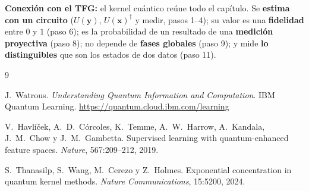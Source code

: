 \documentclass[11pt, a4paper, twoside, openright]{report}
\begin{document}
\noindent \textbf{Conexión con el TFG:} el kernel cuántico reúne todo el capítulo. Se \textbf{estima con un circuito} ($U(\mathbf{y})$, $U(\mathbf{x})^\dagger$ y medir, pasos 1--4); su valor es una \textbf{fidelidad} entre $0$ y $1$ (paso 6); es la probabilidad de un resultado de una \textbf{medición proyectiva} (paso 8); no depende de \textbf{fases globales} (paso 9); y mide \textbf{lo distinguibles} que son los estados de dos datos (paso 11).



\cleardoublepage
\begin{thebibliography}{9}

J.~Watrous.
\newblock \emph{Understanding Quantum Information and Computation}.
\newblock IBM Quantum Learning.
\newblock \url{https://quantum.cloud.ibm.com/learning}

V.~Havlíček, A.~D.~Córcoles, K.~Temme, A.~W.~Harrow, A.~Kandala, J.~M.~Chow y J.~M.~Gambetta.
\newblock Supervised learning with quantum-enhanced feature spaces.
\newblock \emph{Nature}, 567:209--212, 2019.

S.~Thanasilp, S.~Wang, M.~Cerezo y Z.~Holmes.
\newblock Exponential concentration in quantum kernel methods.
\newblock \emph{Nature Communications}, 15:5200, 2024.

\end{thebibliography}
\end{document}

